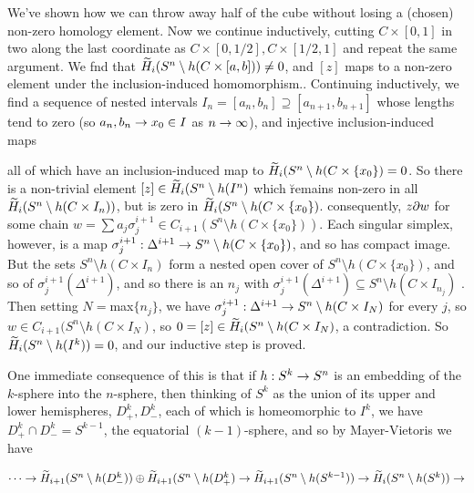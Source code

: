\msk

We've shown how we can throw away half of the cube without losing a (chosen)
non-zero homology element.
Now we continue inductively, cutting $C\times [0,1]$ in two along the last coordinate as
$C\times [0,1/2],C\times [1/2,1]$ and repeat the same argument. We fnd that
$\widetilde{H}_i(S^n\setminus h(C\times [a,b]))\neq 0$, and $[z]$ maps to a non-zero 
element under the inclusion-induced homomorphism.. Continuing inductively, we find a
sequence of nested intervals $I_n=[a_n,b_n]\supseteq [a_{n+1},b_{n+1}]$ 
whose lengths tend to zero (so $a_n,b_n\rightarrow x_0\in I$ as $n\rightarrow\infty$), and injective inclusion-induced maps


all of which have an inclusion-induced map to $\widetilde{H}_i(S^n\setminus h(C\times \{x_0\}) = 0$.
So there is a non-trivial element $[z]\in \widetilde{H}_i(S^n\setminus h(I^n)$ which \u{remains}
non-zero in all $\widetilde{H}_i(S^n\setminus h(C\times I_n))$, but is zero in $\widetilde{H}_i(S^n\setminus h(C\times \{x_0\})$.
consequently, $z\partial w$ for some chain $w=\sum a_j\sigma_j^{i+1}\in C_{i+1}(S^n\setminus h(C\times \{x_0\}))$.
Each singular simplex, however, is a map $\sigma_j^{i+1}:\Delta^{i+1}\rightarrow S^n\setminus h(C\times \{x_0\})$,
and so has compact image. But the sets $S^n\setminus h(C\times I_n)$ form a nested open cover of
$S^n\setminus h(C\times \{x_0\})$, and so of $\sigma_j^{i+1}(\Delta^{i+1})$, and so there is an
$n_j$ with $\sigma_j^{i+1}(\Delta^{i+1})\subseteq S^n\setminus h(C\times I_{n_j})$ .
Then setting $N=$max$\{n_j\}$, we have $\sigma_j^{i+1}:\Delta^{i+1}\rightarrow S^n\setminus h(C\times I_N)$
for every $j$,
so $w\in C_{i+1}(S^n\setminus h(C\times I_N)$, so $0=[z]\in \widetilde{H}_i(S^n\setminus h(C\times I_N)$,
a contradiction. So $\widetilde{H}_i(S^n\setminus h(I^k))=0$, and our inductive step is proved.

\msk

One immediate consequence of this is that if $h:S^k\rightarrow S^n$ is an embedding of the $k$-sphere into the $n$-sphere,
then thinking of $S^k$ as the union of its upper and lower hemispheres, $D^k_+,D^k_-$, each of which is homeomorphic
to $I^k$, we have  $D^k_+\cap D^k_-=S^{k-1}$, the equatorial $(k-1)$-sphere, and so by Mayer-Vietoris we have

\ssk

$\cdots \rightarrow 
\widetilde{H}_{i+1}(S^n\setminus h(D^k_-))\oplus \widetilde{H}_{i+1}(S^n\setminus h(D^k_+)\rightarrow
\widetilde{H}_{i+1}(S^n\setminus h(S^{k-1}))\rightarrow \widetilde{H}_{i}(S^n\setminus h(S^k))\rightarrow$


